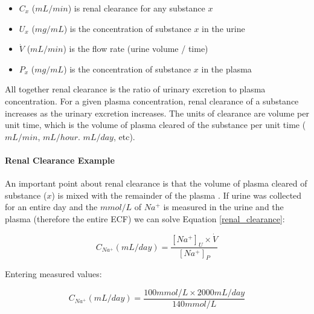 \vspace{4mm}

\begin{itemize}
    \item $C_x$ ($mL/min$) is renal clearance for any substance $x$
    \item $U_x$ ($mg/mL$) is the concentration of substance $x$ in the urine
    \item $\dot{V}$ ($mL/min$) is the flow rate (urine volume / time)
    \item $P_x$ ($mg/mL$) is the concentration of substance $x$ in the plasma
\end{itemize}

All together renal clearance is the ratio of urinary excretion to plasma concentration. For a given plasma concentration, renal clearance of a substance increases as the urinary excretion increases. The units of clearance are volume per unit time, which is the volume of plasma cleared of the substance per unit time ($mL/min$, $mL/hour$. $mL/day$, etc).

\paragraph{Renal Clearance Example}

An important point about renal clearance is that the volume of plasma cleared of substance ($x$) is mixed with the remainder of the plasma \cite{richardson_addressing_2004}. If urine was collected for an entire day and the $mmol/L$ of $Na^+$ is measured in the urine and the plasma (therefore the entire ECF) we can solve Equation \ref{renal_clearance}:

\vspace{4mm}

\begin{equation}
    C_{Na^+} (mL/day) = \frac{[Na^+]_{U} \times \dot{V}}{[Na^+]_{P}}
    \label{Na_Clearance}
\end{equation}

\vspace{4mm}

Entering measured values:

\vspace{4mm}

\begin{equation}
    C_{Na^+} (mL/day) = \frac{100 mmol/L \times 2000 mL/day}{140 mmol/L}
    \label{Na_Clearance_Example}
\end{equation}

\vspace{4mm}

